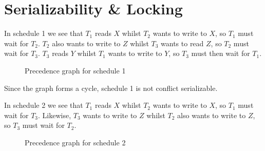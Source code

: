 
\section{Serializability \& Locking}

\begin{multicols}{2}
    In schedule 1 we see that $T_1$ reads $X$ whilst $T_2$ wants to write to
    $X$, so $T_1$ must wait for $T_2$. $T_2$ also wants to write to $Z$ whilst
    $T_3$ wants to read $Z$, so $T_2$ must wait for $T_3$. $T_3$ reads $Y$
    whilst $T_1$ wants to write to $Y$, so $T_3$ must then wait for $T_1$.
    \begin{figure}[H]
        \centering
        \caption{Precedence graph for schedule 1}
        \label{fig:trans-schedule-1}
    \end{figure}
    Since the graph forms a cycle, schedule 1 is not conflict serializable.

    \colbreak

    In schedule 2 we see that $T_1$ reads $X$ whilst $T_2$ wants to write to
    $X$, so $T_1$ must wait for $T_3$. Likewise, $T_3$ wants to write to $Z$
    whilst $T_2$ also wants to write to $Z$, so $T_3$ must wait for $T_2$.
    \begin{figure}[H]
        \centering
        \caption{Precedence graph for schedule 2}
        \label{fig:trans-schedule-2}
    \end{figure}

\end{multicols}
